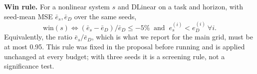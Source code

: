 \textbf{Win rule.} For a nonlinear system $s$ and DLinear on a task and horizon, with seed-mean MSE $\bar e_s,\bar e_D$ over the same seeds,
\begin{equation}\text{win}(s)\iff (\bar e_s-\bar e_D)/\bar e_D\le-5\%\ \text{ and }\ e_s^{(i)}<e_D^{(i)}\ \forall i.\end{equation}
Equivalently, the ratio $\bar e_s/\bar e_D$, which is what we report for the main grid, must be at most 0.95. This rule was fixed in the proposal before running and is applied unchanged at every budget; with three seeds it is a screening rule, not a significance test.
